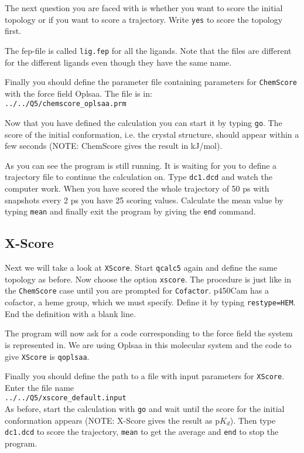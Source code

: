 \documentclass[a4paper,12pt]{article}
\newcommand{\qcalc}{\texttt{qcalc5}}
\newcommand{\chemscore} {\texttt{ChemScore}}
\newcommand{\xscore} {\texttt{X\-Score}}
\begin{document}
\noindent The next question you are faced with is whether you want
to score the initial topology or if you want to score a
trajectory. Write \texttt{yes} to score the topology first.

\noindent The fep-file is called \texttt{lig.fep} for all the
ligands. Note that the files are different for the
different ligands even though they have the same name.

\noindent Finally you should define the parameter file containing
parameters for {\chemscore} with the force field Oplsaa. The file
is
in:\\
\texttt{../../Q5/chemscore\_oplsaa.prm
}

\noindent Now that you have defined the calculation you can start
it by typing \texttt{go}. The score of the initial conformation,
i.e. the crystal structure, should appear within a few seconds
(NOTE: ChemScore gives the result in kJ/mol).

As you can see the program is still running. It is waiting for you
to define a trajectory file to continue the calculation on. Type
\texttt{dc1.dcd} and watch the computer work. When you have scored
the whole trajectory of 50 ps with snapshots every 2 ps you have
25 scoring values. Calculate the mean value by typing
\texttt{mean} and finally exit the program by giving the
\texttt{end} command.

\subsection {X-Score}

Next we will take a look at {\xscore}. Start {\qcalc} again and
define the same topology as before. Now choose the option
\texttt{xscore}. The procedure is just like in the {\chemscore}
case until you are prompted for \texttt{Cofactor}. p450Cam has a
cofactor, a heme group, which we must specify. Define it by typing
\texttt{restype=HEM}. End the definition with a blank line.

\noindent The program will now ask for a code corresponding to the
force field the system is represented in. We are using Oplsaa in
this molecular system and the code to give {\xscore} is
\texttt{qoplsaa}.

\noindent Finally you should define the path to a file with input
parameters for {\xscore}. Enter the file name\\
\texttt{../../Q5/xscore\_default.input}\\

\noindent As before, start the calculation with \texttt{go} and
wait until the score for the initial conformation appears (NOTE: 
X-Score gives the result as p$K_{d}$). Then
type \texttt{dc1.dcd} to score the trajectory, \texttt{mean} to
get the average and \texttt{end} to stop the program.
\end{document}
